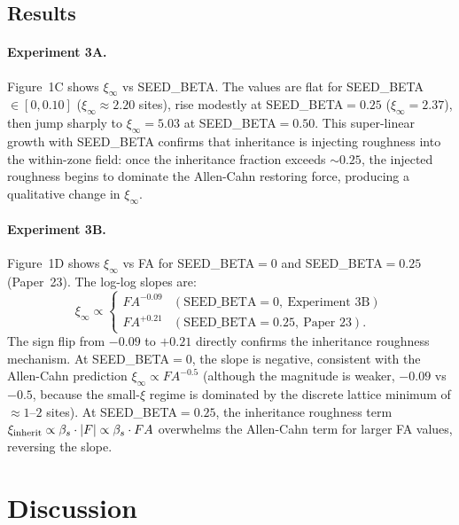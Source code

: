 \documentclass[11pt]{article}
\begin{document}
\subsection{Results}

\paragraph{Experiment 3A.}
Figure~1C shows $\xi_\infty$ vs SEED\_BETA.
The values are flat for SEED\_BETA $\in [0, 0.10]$
($\xi_\infty \approx 2.20$ sites), rise modestly at SEED\_BETA$=0.25$
($\xi_\infty = 2.37$), then jump sharply to $\xi_\infty = 5.03$ at
SEED\_BETA$=0.50$.
This super-linear growth with SEED\_BETA confirms that inheritance is
injecting roughness into the within-zone field: once the inheritance
fraction exceeds ${\sim}0.25$, the injected roughness begins to
dominate the Allen-Cahn restoring force, producing a
qualitative change in $\xi_\infty$.

\paragraph{Experiment 3B.}
Figure~1D shows $\xi_\infty$ vs FA for SEED\_BETA$=0$ and SEED\_BETA$=0.25$
(Paper~23).
The log-log slopes are:
\begin{equation}
  \xi_\infty \propto
  \begin{cases}
    FA^{-0.09} & (\text{SEED\_BETA}=0,\ \text{Experiment~3B}) \\
    FA^{+0.21} & (\text{SEED\_BETA}=0.25,\ \text{Paper~23}).
  \end{cases}
  \label{eq:slopes}
\end{equation}
The sign flip from $-0.09$ to $+0.21$ directly confirms the inheritance
roughness mechanism.
At SEED\_BETA$=0$, the slope is negative, consistent with the Allen-Cahn
prediction $\xi_\infty \propto FA^{-0.5}$ (although the magnitude is
weaker, $-0.09$ vs $-0.5$, because the small-$\xi$ regime is dominated
by the discrete lattice minimum of $\approx 1$--$2$ sites).
At SEED\_BETA$=0.25$, the inheritance roughness term
$\xi_{\rm inherit} \propto \beta_s \cdot |F| \propto \beta_s \cdot FA$
overwhelms the Allen-Cahn term for larger FA values, reversing the slope.

\section{Discussion}
\end{document}
